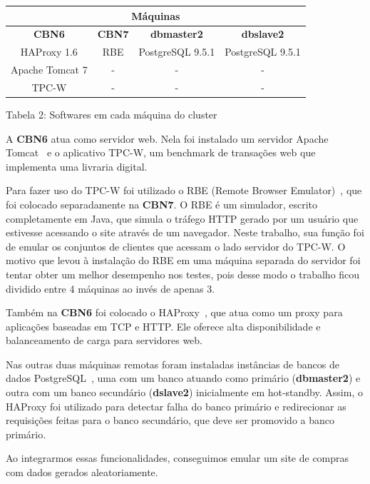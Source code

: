 \documentclass[11pt,twoside]{article}
\begin{document}
    \begin{center}
        \begin{tabular}{| c | c | c | c |}
            \hline
            \multicolumn{4}{|c|}{Máquinas} \\ \hline
            \textbf{CBN6} & \textbf{CBN7} & \textbf{dbmaster2} & \textbf{dbslave2} \\ \hline
            HAProxy 1.6 & RBE & PostgreSQL 9.5.1 & PostgreSQL 9.5.1 \\ \hline
            Apache Tomcat 7 & - & - & - \\ \hline
            TPC-W & - & - & - \\ \hline
        \end{tabular}
        
        Tabela 2: Softwares em cada máquina do cluster
    \end{center}

    A \textbf{CBN6} atua como servidor web. Nela foi instalado um servidor Apache Tomcat~\cite{tomcat} e o aplicativo TPC-W, um benchmark de transa\c{c}\~oes web que implementa uma livraria digital. 
    
    Para fazer uso do TPC-W foi utilizado o RBE (Remote Browser Emulator)~\cite{RBE}, que foi colocado separadamente na \textbf{CBN7}. O RBE \'e um simulador, escrito completamente em Java, que simula o tr\'afego HTTP gerado por um usu\'ario que estivesse acessando o site atrav\'es de um navegador. Neste trabalho, sua função foi de emular os conjuntos de clientes que acessam o lado servidor do TPC-W. O motivo que levou à instalação do RBE em uma máquina separada do servidor foi tentar obter um melhor desempenho nos testes, pois desse modo o trabalho ficou dividido entre 4 máquinas ao invés de apenas 3. 

    Também na \textbf{CBN6} foi colocado o HAProxy~\cite{haproxy}, que atua como um proxy para aplicações baseadas em TCP e HTTP. Ele oferece alta disponibilidade e balanceamento de carga para servidores web. 
    
    Nas outras duas máquinas remotas foram instaladas instâncias de bancos de dados PostgreSQL~\cite{postgresql}, uma com um banco atuando como primário (\textbf{dbmaster2}) e outra com um banco secundário (\textbf{dslave2}) inicialmente em hot-standby. Assim, o HAProxy foi utilizado para detectar falha do banco primário e redirecionar as requisições feitas para o banco secundário, que deve ser promovido a banco primário.
    
    Ao integrarmos essas funcionalidades, conseguimos emular um site de compras com dados gerados aleatoriamente.
\end{document}

